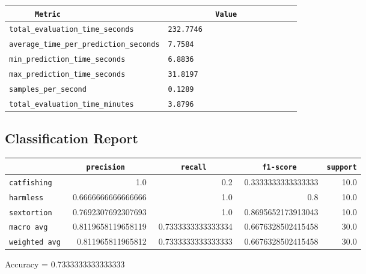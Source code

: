 \documentclass{article}
\begin{document}
\begin{center}
\begin{tabular}{l | l} \hline
    \verb|      Metric     | & \verb|           Value           | \\ \hline
    \hline
    \verb|total_evaluation_time_seconds| & \verb|232.7746                     | \\ \hline
    \verb|average_time_per_prediction_seconds| & \verb|7.7584                       | \\ \hline
    \verb|min_prediction_time_seconds| & \verb|6.8836                       | \\ \hline
    \verb|max_prediction_time_seconds| & \verb|31.8197                      | \\ \hline
    \verb|samples_per_second| & \verb|0.1289                       | \\ \hline
    \verb|total_evaluation_time_minutes| & \verb|3.8796                       | \\ \hline
\end{tabular}
\end{center}

\subsection{Classification Report}

\begin{center}
\begin{tabular}{l | r | r | r | r} \hline
    \verb|            | & \verb|    precision     | & \verb|      recall      | & \verb|     f1-score     | & \verb|support| \\ \hline
    \hline
    \verb|catfishing | & 1.0 & 0.2 & 0.3333333333333333 &    10.0 \\ \hline
    \verb|harmless   | & 0.6666666666666666 & 1.0 & 0.8 &    10.0 \\ \hline
    \verb|sextortion | & 0.7692307692307693 & 1.0 & 0.8695652173913043 &    10.0 \\ \hline
    \verb|macro avg  | & 0.8119658119658119 & 0.7333333333333334 & 0.6676328502415458 &    30.0 \\ \hline
    \verb|weighted avg| & 0.811965811965812 & 0.7333333333333333 & 0.6676328502415458 &    30.0 \\ \hline
\end{tabular}
\end{center}

\begin{center}
Accuracy = 0.7333333333333333
\end{center}
\end{document}
